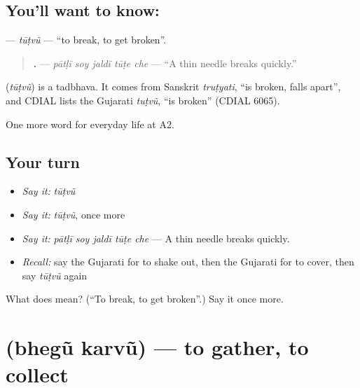 \subsection*{You'll want to know: }
\textbf{} — \emph{tūṭvũ} — \textquotedblleft{}to break, to get broken\textquotedblright{}.

\begin{quote}
\textbf{    .} — \emph{pātḷī soy jaldī tūṭe che} — \textquotedblleft{}A thin needle breaks quickly.\textquotedblright{}
\end{quote}

\begin{cousinweb}
\textbf{} (\emph{tūṭvũ}) is a tadbhava. It comes from Sanskrit \emph{truṭyati}, \textquotedblleft{}is broken, falls apart\textquotedblright{}, and CDIAL lists the Gujarati \emph{tuṭvũ}, \textquotedblleft{}is broken\textquotedblright{} (CDIAL 6065).
\end{cousinweb}

\begin{grammarlens}[title={What you've built}]
One more word for everyday life at A2.
\end{grammarlens}

\subsection*{Your turn}
\begin{itemize}
\raggedright
  \item \emph{Say it:} \emph{tūṭvũ}
  \item \emph{Say it:} \emph{tūṭvũ}, once more
  \item \emph{Say it:} \emph{pātḷī soy jaldī tūṭe che} — A thin needle breaks quickly.
  \item \emph{Recall:} say the Gujarati for to shake out, then the Gujarati for to cover, then say \emph{tūṭvũ} again
\end{itemize}

\begin{tcolorbox}[breakable,colback=teal!4,colframe=teal!35!black,title={Before you move on}]
What does  mean? (\textquotedblleft{}To break, to get broken\textquotedblright{}.) Say it once more.
\end{tcolorbox}
\section[\texorpdfstring{\gu{ભેગું} \gu{કરવું} (bhegũ karvũ)}{ભેગું કરવું (bhegũ karvũ)}]{  (bhegũ karvũ) — to gather, to collect}

